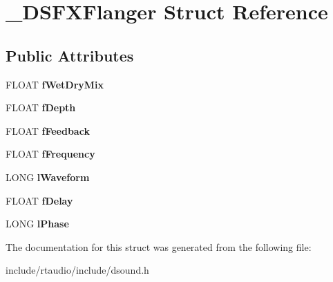 \hypertarget{struct___d_s_f_x_flanger}{}\section{\+\_\+\+D\+S\+F\+X\+Flanger Struct Reference}
\label{struct___d_s_f_x_flanger}
\subsection*{Public Attributes}
\begin{DoxyCompactItemize}
\item 
F\+L\+O\+AT {\bfseries f\+Wet\+Dry\+Mix}\hypertarget{struct___d_s_f_x_flanger_a47b82689fcafef3118b4c2f7305ad976}{}\label{struct___d_s_f_x_flanger_a47b82689fcafef3118b4c2f7305ad976}

\item 
F\+L\+O\+AT {\bfseries f\+Depth}\hypertarget{struct___d_s_f_x_flanger_a79876719130e0ddb29fb0afeaa807428}{}\label{struct___d_s_f_x_flanger_a79876719130e0ddb29fb0afeaa807428}

\item 
F\+L\+O\+AT {\bfseries f\+Feedback}\hypertarget{struct___d_s_f_x_flanger_af9709fba2d9b547614269e4e9e0c9e9f}{}\label{struct___d_s_f_x_flanger_af9709fba2d9b547614269e4e9e0c9e9f}

\item 
F\+L\+O\+AT {\bfseries f\+Frequency}\hypertarget{struct___d_s_f_x_flanger_a25bd967de840730aff289f7d8c596fa8}{}\label{struct___d_s_f_x_flanger_a25bd967de840730aff289f7d8c596fa8}

\item 
L\+O\+NG {\bfseries l\+Waveform}\hypertarget{struct___d_s_f_x_flanger_ab78de56d15ea0dbfda482ff3f8f387c1}{}\label{struct___d_s_f_x_flanger_ab78de56d15ea0dbfda482ff3f8f387c1}

\item 
F\+L\+O\+AT {\bfseries f\+Delay}\hypertarget{struct___d_s_f_x_flanger_afc7a9d712a0b5a98406b54ee30f6fedd}{}\label{struct___d_s_f_x_flanger_afc7a9d712a0b5a98406b54ee30f6fedd}

\item 
L\+O\+NG {\bfseries l\+Phase}\hypertarget{struct___d_s_f_x_flanger_ad0a90e868aef2aec1d1af4de2f8293e6}{}\label{struct___d_s_f_x_flanger_ad0a90e868aef2aec1d1af4de2f8293e6}

\end{DoxyCompactItemize}


The documentation for this struct was generated from the following file\+:\begin{DoxyCompactItemize}
\item 
include/rtaudio/include/dsound.\+h\end{DoxyCompactItemize}
